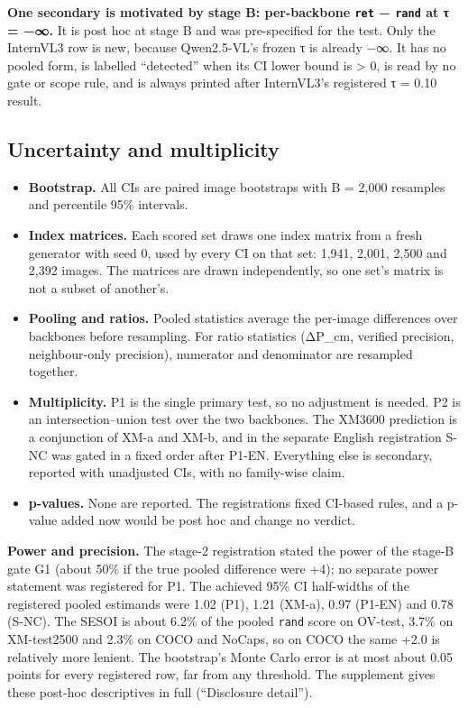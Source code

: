 \textbf{One secondary is motivated by stage B: per-backbone \texttt{ret} − \texttt{rand} at τ = −∞.}
It is post hoc at stage B and was pre-specified for the test. Only the InternVL3 row is new, because
Qwen2.5-VL's frozen τ is already −∞. It has no pooled form, is labelled ``detected'' when its CI
lower bound is \textgreater{} 0, is read by no gate or scope rule, and is always printed after
InternVL3's registered τ = 0.10 result.

\subsection{Uncertainty and multiplicity}\label{uncertainty-and-multiplicity}

\begin{itemize}
\tightlist
\item
  \textbf{Bootstrap.} All CIs are paired image bootstraps with B = 2,000 resamples and percentile
  95\% intervals.
\item
  \textbf{Index matrices.} Each scored set draws one index matrix from a fresh generator with seed
  0, used by every CI on that set: 1,941, 2,001, 2,500 and 2,392 images. The matrices are drawn
  independently, so one set's matrix is not a subset of another's.
\item
  \textbf{Pooling and ratios.} Pooled statistics average the per-image differences over backbones
  before resampling. For ratio statistics (ΔP\_cm, verified precision, neighbour-only precision),
  numerator and denominator are resampled together.
\item
  \textbf{Multiplicity.} P1 is the single primary test, so no adjustment is needed. P2 is an
  intersection--union test over the two backbones. The XM3600 prediction is a conjunction of XM-a
  and XM-b, and in the separate English registration S-NC was gated in a fixed order after P1-EN.
  Everything else is secondary, reported with unadjusted CIs, with no family-wise claim.
\item
  \textbf{p-values.} None are reported. The registrations fixed CI-based rules, and a p-value added
  now would be post hoc and change no verdict.
\end{itemize}

\textbf{Power and precision.} The stage-2 registration stated the power of the stage-B gate G1
(about 50\% if the true pooled difference were +4); no separate power statement was registered for
P1. The achieved 95\% CI half-widths of the registered pooled estimands were 1.02 (P1), 1.21 (XM-a),
0.97 (P1-EN) and 0.78 (S-NC). The SESOI is about 6.2\% of the pooled \texttt{rand} score on OV-test,
3.7\% on XM-test2500 and 2.3\% on COCO and NoCaps, so on COCO the same +2.0 is relatively more
lenient. The bootstrap's Monte Carlo error is at most about 0.05 points for every registered row,
far from any threshold. The supplement gives these post-hoc descriptives in full (``Disclosure
detail'').

